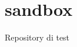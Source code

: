 \chapter{sandbox }
\hypertarget{md__r_e_a_d_m_e}{}\label{md__r_e_a_d_m_e}
\label{md__r_e_a_d_m_e_autotoc_md0}%
%


Repository di test 